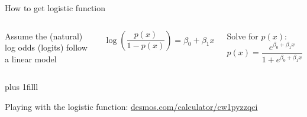 \documentclass[aspectratio=169,dvipsnames]{beamer}
\newcommand{\InstructorList}[1]{
\begin{itemize}
	\color{orange}
	#1
\end{itemize}
}
\renewcommand{\InstructorList}[1]{}
\newcommand{\bvfill}{\vskip0pt plus 1filll}
\begin{document}



\begin{frame}[c]{How to get logistic function}

\begin{columns}
\centering
Assume the (natural) log odds (logits) follow a linear model

\begin{equation*}
	\log \left( \frac{p(x)}{1-p(x)} \right) = \beta_0 + \beta_1x
\end{equation*}


\centering
Solve for $p(x)$:
\begin{equation*}
	p(x) = \frac{e^{\beta_0 + \beta_1x}}{1+e^{\beta_0 + \beta_1x}}
\end{equation*}
\end{columns}
\InstructorList{
	\item odds more often associated with bets "doubling down"
	\item human (animals) perceives doubling in physical quantity as 1 unit of perceptual change, log converts former to latter (Weber's Law)
}
\bvfill

Playing with the logistic function: \href{https://www.desmos.com/calculator/cw1pyzzqci}{desmos.com/calculator/cw1pyzzqci}
\end{frame}





\end{document}
